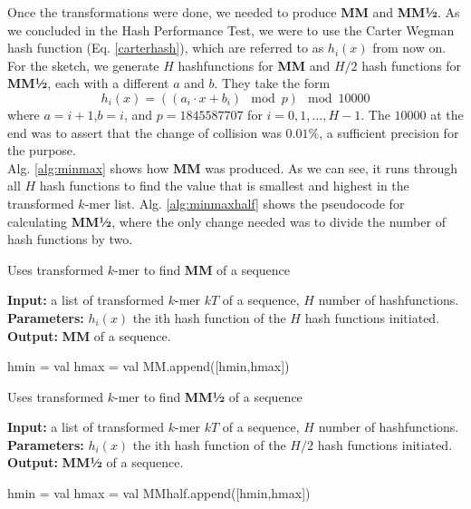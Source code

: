 \documentclass[../../main.tex]{subfiles}
\begin{document}
Once the transformations were done, we needed to produce {\bf MM} and {\bf MM½}. As we concluded in the Hash Performance Test, we were to use the Carter Wegman hash function (Eq. \ref{carterhash}), which are referred to as $h_i(x)$ from now on. For the sketch, we generate $H$ hashfunctions for {\bf MM} and $H/2$ hash functions for {\bf MM½}, each with a different $a$ and $b$. They take the form 
$$
h_i(x)=((a_i\cdot x + b_i) \mod p )\mod 10000
$$
where $a=i+1$,$b=i$, and $p=1845587707$ for $i=0,1,...,H-1$. The $10000$ at the end was to assert that the change of collision was $0.01\%$, a sufficient precision for the purpose.\\

Alg. \ref{alg:minmax} shows how {\bf MM} was produced. As we can see, it runs through all $H$ hash functions to find the value that is smallest and highest in the transformed $k$-mer list. Alg. \ref{alg:minmaxhalf} shows the pseudocode for calculating {\bf MM½}, where the only change needed was to divide the number of hash functions by two.

\begin{algorithm}
\caption{Uses transformed $k$-mer to find {\bf MM} of a sequence}\label{alg:minmax}
\textbf{Input:} a list of transformed $k$-mer $kT$ of a sequence, $H$ number of hashfunctions.\\
\textbf{Parameters:} $h_i(x)$ the ith hash function of the $H$ hash functions initiated.\\
\textbf{Output:} {\bf MM} of a sequence.
\begin{algorithmic}[1]
\Statex
{}
				hmin = val
			\EndIf
				hmax = val
			\EndIf
		\EndFor
		\State MM.append([hmin,hmax])
	\EndFor
\State {}
\EndFunction
\end{algorithmic}
\end{algorithm}

\begin{algorithm}
\caption{Uses transformed $k$-mer to find {\bf MM½} of a sequence}\label{alg:minmaxhalf}
\textbf{Input:} a list of transformed $k$-mer $kT$ of a sequence, $H$ number of hashfunctions.\\
\textbf{Parameters:} $h_i(x)$ the ith hash function of the $H/2$ hash functions initiated.\\
\textbf{Output:} {\bf MM½} of a sequence.
\begin{algorithmic}[1]
\Statex
{}
				hmin = val
			\EndIf
				hmax = val
			\EndIf
		\EndFor
		\State MMhalf.append([hmin,hmax])
	\EndFor
\State {}
\EndFunction
\end{algorithmic}
\end{algorithm}
\end{document}
